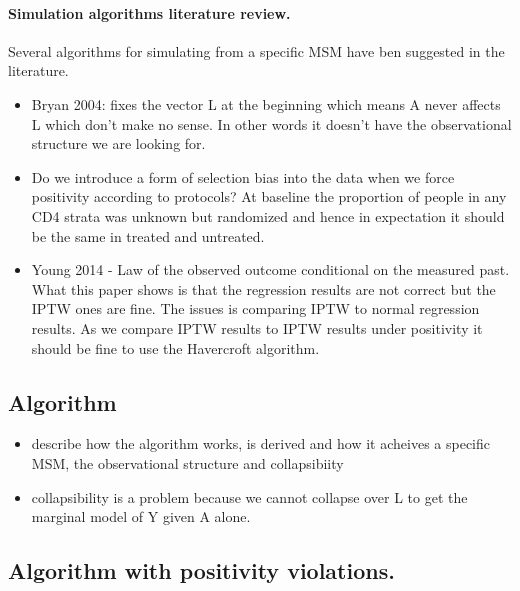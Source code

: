 \documentclass[11pt]{article}
\providecommand{\tightlist}{%
      \setlength{\itemsep}{0pt}\setlength{\parskip}{0pt}}
\begin{document}
\paragraph{Simulation algorithms literature
review.}\label{simulation-algorithms-literature-review.}

Several algorithms for simulating from a specific MSM have ben suggested
in the literature.

\citet{Havercroft2012} \citet{Bryan2004} \citet{Westreich2012}
\citet{Young2014}

\begin{itemize}
\tightlist
\item
  Bryan 2004: fixes the vector L at the beginning which means A never
  affects L which don't make no sense. In other words it doesn't have
  the observational structure we are looking for.
\item
  Do we introduce a form of selection bias into the data when we force
  positivity according to protocols? At baseline the proportion of
  people in any CD4 strata was unknown but randomized and hence in
  expectation it should be the same in treated and untreated.
\item
  Young 2014 - Law of the observed outcome conditional on the measured
  past. What this paper shows is that the regression results are not
  correct but the IPTW ones are fine. The issues is comparing IPTW to
  normal regression results. As we compare IPTW results to IPTW results
  under positivity it should be fine to use the Havercroft algorithm.
\end{itemize}

\subsection{Algorithm}\label{algorithm}

\begin{itemize}
\tightlist
\item
  describe how the algorithm works, is derived and how it acheives a
  specific MSM, the observational structure and collapsibiity
\item
  collapsibility is a problem because we cannot collapse over L to get
  the marginal model of Y given A alone.
\end{itemize}

\subsection{Algorithm with positivity
violations.}\label{algorithm-with-positivity-violations.}
\end{document}
